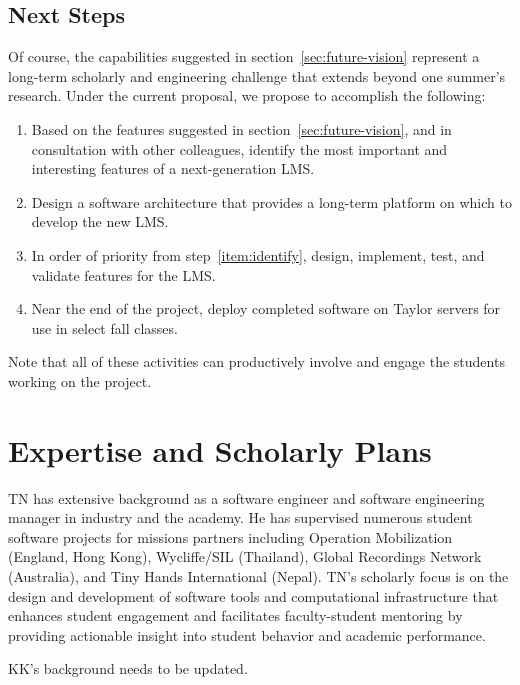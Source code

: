 \documentclass{article}
\begin{document}
\subsection{Next Steps}
\label{sec:next-steps}

Of course,
the capabilities suggested in section~\ref{sec:future-vision}
represent a long-term scholarly and engineering challenge
that extends beyond one summer's research.
Under the current proposal,
we propose to accomplish the following:
\begin{enumerate}
\item\label{item:identify}
  Based on the features suggested in section~\ref{sec:future-vision},
  and in consultation with other colleagues,
  identify the most important and interesting features of
  a next-generation LMS.
\item Design a software architecture
  that provides a long-term platform on which to develop
  the new LMS.
\item In order of priority from step~\ref{item:identify},
  design, implement, test, and validate features for the LMS.
\item Near the end of the project,
  deploy completed software on Taylor servers
  for use in select fall classes.
\end{enumerate}
Note that all of these activities can productively
involve and engage the students working on the project.

\section{Expertise and Scholarly Plans}
\label{sec:expertise-plans}


TN has extensive background as a software engineer
and software engineering manager
in industry and the academy.
He has supervised numerous student software projects
for missions partners including
Operation Mobilization (England, Hong Kong),
Wycliffe/SIL (Thailand),
Global Recordings Network (Australia),
and
Tiny Hands International (Nepal).
TN's scholarly focus is on the design and development
of software tools and computational infrastructure
that enhances student engagement
and facilitates faculty-student mentoring
by providing actionable insight
into student behavior and academic performance.

\begin{framed}
  KK's background needs to be updated.
\end{framed}
\end{document}
